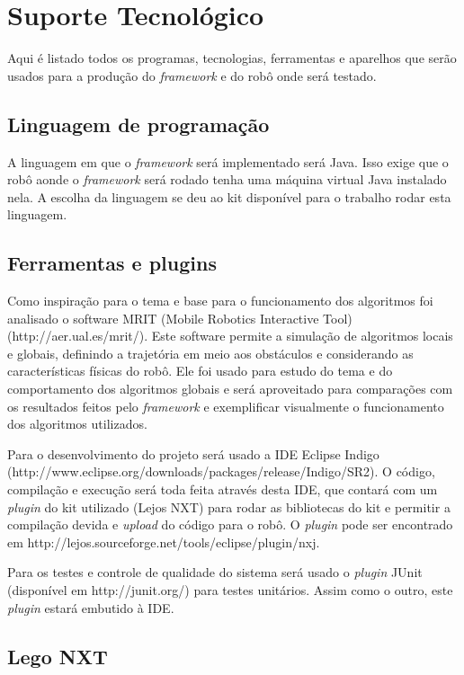 \chapter[Suporte Tecnológico]{Suporte Tecnológico}

Aqui é listado todos os programas, tecnologias, ferramentas e aparelhos que serão  usados para a produção do \textit{framework} e do robô onde será testado. 

\section{Linguagem de programação}

A linguagem em que o \textit{framework} será implementado será Java. Isso exige que o robô aonde o \textit{framework} será rodado tenha uma máquina virtual Java instalado nela. A escolha da linguagem se deu ao kit disponível para o trabalho rodar esta linguagem.

\section{Ferramentas e plugins}

Como inspiração para o tema e base para o funcionamento dos algoritmos foi analisado o software MRIT (Mobile Robotics Interactive Tool) (http://aer.ual.es/mrit/). Este software permite a simulação de algoritmos locais e globais, definindo a trajetória em meio aos obstáculos e considerando as características físicas do robô. Ele foi usado para estudo do tema e do comportamento dos algoritmos globais e será aproveitado para comparações com os resultados feitos pelo \textit{framework} e exemplificar visualmente o funcionamento dos algoritmos utilizados.

Para o desenvolvimento do projeto será usado a IDE Eclipse Indigo (http://www.eclipse.org/downloads/packages/release/Indigo/SR2). O código, compilação e execução será toda feita através desta IDE, que contará com um \textit{plugin} do kit utilizado (Lejos NXT) para rodar as bibliotecas do kit e permitir a compilação devida e \textit{upload} do código para o robô. O \textit{plugin} pode ser encontrado em http://lejos.sourceforge.net/tools/eclipse/plugin/nxj.

Para os testes e controle de qualidade do sistema será usado o \textit{plugin} JUnit (disponível em http://junit.org/) para testes unitários. Assim como o outro, este \textit{plugin} estará embutido à IDE.

\section{Lego NXT}

